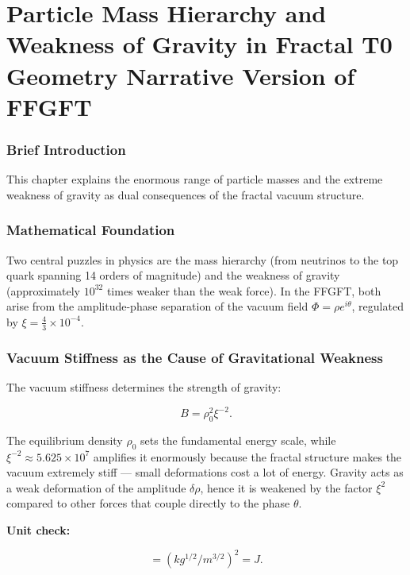 \chapter{Particle Mass Hierarchy and Weakness of Gravity in Fractal T0 Geometry  Narrative Version of FFGFT}


	
	\subsection*{Brief Introduction}
	
	This chapter explains the enormous range of particle masses and the extreme weakness of gravity as dual consequences of the fractal vacuum structure.
	
	\subsection*{Mathematical Foundation}
	
	Two central puzzles in physics are the mass hierarchy (from neutrinos to the top quark spanning 14 orders of magnitude) and the weakness of gravity (approximately \(10^{32}\) times weaker than the weak force). In the FFGFT, both arise from the amplitude-phase separation of the vacuum field \(\Phi = \rho e^{i\theta}\), regulated by \(\xi = \frac{4}{3} \times 10^{-4}\).
	

	
	\subsection*{Vacuum Stiffness as the Cause of Gravitational Weakness}
	
	The vacuum stiffness determines the strength of gravity:
	
	\begin{equation}
		B = \rho_0^2 \xi^{-2}.
	\end{equation}
	
	The equilibrium density \(\rho_0\) sets the fundamental energy scale, while \(\xi^{-2} \approx 5.625 \times 10^7\) amplifies it enormously because the fractal structure makes the vacuum extremely stiff — small deformations cost a lot of energy. Gravity acts as a weak deformation of the amplitude \(\delta \rho\), hence it is weakened by the factor \(\xi^2\) compared to other forces that couple directly to the phase \(\theta\).
	
	\textbf{Unit check:}
	
	\begin{equation}
		[B] = (\si{kg^{1/2}/m^{3/2}})^2 = \si{J}.
	\end{equation}
	
